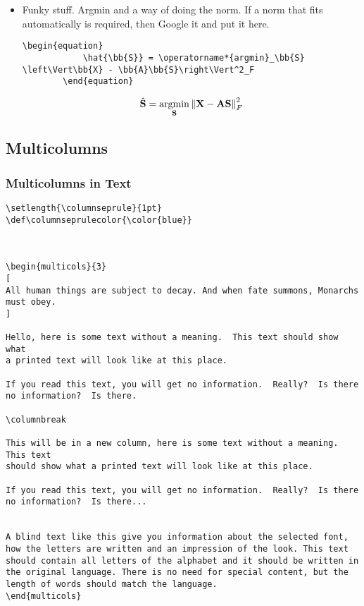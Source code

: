 \begin{itemize}
    \begin{lstlisting}[language = Tex, numbers = none]
        \usepackage{mathtools}
        \mathtoolsset{showonlyrefs}
    \end{lstlisting}
    \item Funky stuff. Argmin and a way of doing the norm. If a norm that fits automatically is required, then Google it and put it  here.
    \begin{lstlisting}[language = Tex, numbers = none]
        \begin{equation}
            \hat{\bb{S}} = \operatorname*{argmin}_\bb{S} \left\Vert\bb{X} - \bb{A}\bb{S}\right\Vert^2_F
        \end{equation}
    \end{lstlisting}
    \begin{equation}
        \hat{\textbf{S}} = \operatorname*{argmin}_{\textbf{S}} \left\Vert\textbf{X} - \textbf{A}\textbf{S}\right\Vert^2_F
    \end{equation}
\end{itemize}






\subsection{Multicolumns}

\subsubsection{Multicolumns in Text}

\begin{lstlisting}[language=Tex]
\setlength{\columnseprule}{1pt}
\def\columnseprulecolor{\color{blue}}
 

 
\begin{multicols}{3}
[
All human things are subject to decay. And when fate summons, Monarchs must obey.
]
 
Hello, here is some text without a meaning.  This text should show what 
a printed text will look like at this place.
 
If you read this text, you will get no information.  Really?  Is there 
no information?  Is there.
 
\columnbreak
 
This will be in a new column, here is some text without a meaning.  This text 
should show what a printed text will look like at this place.
 
If you read this text, you will get no information.  Really?  Is there 
no information?  Is there...


A blind text like this give you information about the selected font, how the letters are written and an impression of the look. This text should contain all letters of the alphabet and it should be written in the original language. There is no need for special content, but the length of words should match the language.
\end{multicols}
\end{lstlisting}

